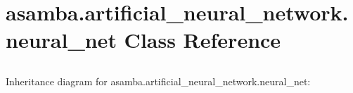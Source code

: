 \hypertarget{classasamba_1_1artificial__neural__network_1_1neural__net}{}\section{asamba.\+artificial\+\_\+neural\+\_\+network.\+neural\+\_\+net Class Reference}
\label{classasamba_1_1artificial__neural__network_1_1neural__net}


\paragraph*{}

\subsection*{}

\subsection*{}

\subsection*{}

\subsection*{}

\subsection*{}

\subparagraph*{} 




Inheritance diagram for asamba.\+artificial\+\_\+neural\+\_\+network.\+neural\+\_\+net\+:
